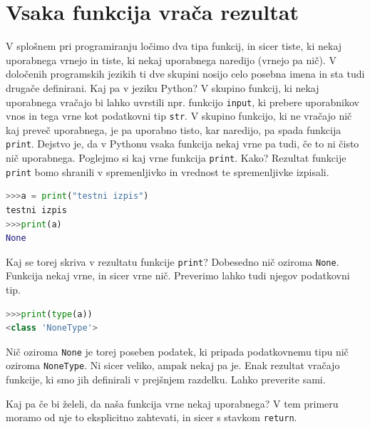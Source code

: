 \section{Vsaka funkcija vrača rezultat}
V splošnem pri programiranju ločimo dva tipa funkcij, in sicer tiste, ki nekaj uporabnega vrnejo in tiste, ki nekaj uporabnega naredijo (vrnejo pa nič). V določenih programskih jezikih ti dve skupini nosijo celo posebna imena in sta tudi drugače definirani. Kaj pa v jeziku Python? V skupino funkcij, ki nekaj uporabnega vračajo bi lahko uvrstili npr. funkcijo \texttt{input}, ki prebere uporabnikov vnos in tega vrne kot podatkovni tip \texttt{str}. V skupino funkcijo, ki ne vračajo nič kaj preveč uporabnega, je pa uporabno tisto, kar naredijo, pa spada funkcija \texttt{print}. Dejstvo je, da v Pythonu vsaka funkcija nekaj vrne pa tudi, če to ni čisto nič uporabnega. Poglejmo si kaj vrne funkcija \texttt{print}. Kako? Rezultat funkcije \texttt{print} bomo shranili v spremenljivko in vrednost te spremenljivke izpisali.
\begin{lstlisting}[language=Python]
>>>a = print("testni izpis")
testni izpis
>>>print(a)
None
\end{lstlisting}
Kaj se torej skriva v rezultatu funkcije \texttt{print}? Dobesedno nič oziroma \texttt{None}. Funkcija nekaj vrne, in sicer vrne nič. Preverimo lahko tudi njegov podatkovni tip.
\begin{lstlisting}[language=Python]
>>>print(type(a))
<class 'NoneType'>
\end{lstlisting}
Nič oziroma \texttt{None} je torej poseben podatek, ki pripada podatkovnemu tipu nič oziroma \texttt{NoneType}. Ni sicer veliko, ampak nekaj pa je. Enak rezultat vračajo funkcije, ki smo jih definirali v prejšnjem razdelku. Lahko preverite sami.

Kaj pa če bi želeli, da naša funkcija vrne nekaj uporabnega? V tem primeru moramo od nje to eksplicitno zahtevati, in sicer s stavkom \texttt{return}.


